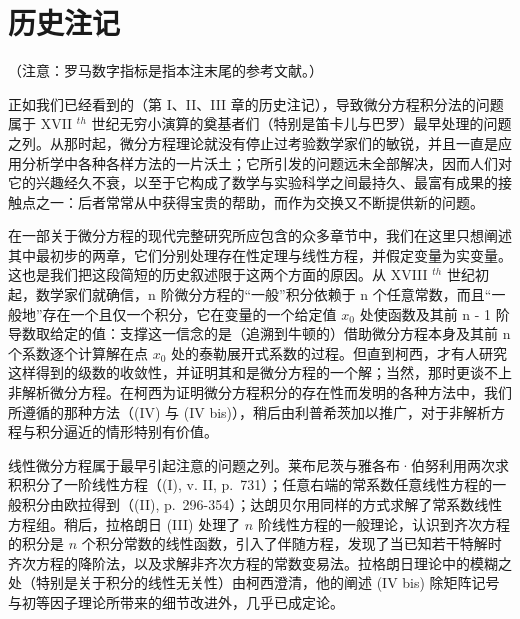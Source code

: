\section*{历史注记}
{}

（注意：罗马数字指标是指本注末尾的参考文献。）

正如我们已经看到的（第 I、II、III 章的历史注记），导致微分方程积分法的问题属于 XVII \(^{th}\) 世纪无穷小演算的奠基者们（特别是笛卡儿与巴罗）最早处理的问题之列。从那时起，微分方程理论就没有停止过考验数学家们的敏锐，并且一直是应用分析学中各种各样方法的一片沃土；它所引发的问题远未全部解决，因而人们对它的兴趣经久不衰，以至于它构成了数学与实验科学之间最持久、最富有成果的接触点之一：后者常常从中获得宝贵的帮助，而作为交换又不断提供新的问题。

在一部关于微分方程的现代完整研究所应包含的众多章节中，我们在这里只想阐述其中最初步的两章，它们分别处理存在性定理与线性方程，并假定变量为实变量。这也是我们把这段简短的历史叙述限于这两个方面的原因。从 XVIII \(^{th}\) 世纪初起，数学家们就确信，n 阶微分方程的“一般”积分依赖于 n 个任意常数，而且“一般地”存在一个且仅一个积分，它在变量的一个给定值 \(x_{0}\) 处使函数及其前 n - 1 阶导数取给定的值：支撑这一信念的是（追溯到牛顿的）借助微分方程本身及其前 n 个系数逐个计算解在点 \(x_{0}\) 处的泰勒展开式系数的过程。但直到柯西，才有人研究这样得到的级数的收敛性，并证明其和是微分方程的一个解；当然，那时更谈不上非解析微分方程。在柯西为证明微分方程积分的存在性而发明的各种方法中，我们所遵循的那种方法（(IV) 与 (IV bis)），稍后由利普希茨加以推广，对于非解析方程与积分逼近的情形特别有价值。

线性微分方程属于最早引起注意的问题之列。莱布尼茨与雅各布·伯努利用两次求积积分了一阶线性方程（(I), v. II, p.~731）；任意右端的常系数任意线性方程的一般积分由欧拉得到（(II), p.~296-354）；达朗贝尔用同样的方式求解了常系数线性方程组。稍后，拉格朗日 (III) 处理了 \(n\) 阶线性方程的一般理论，认识到齐次方程的积分是 \(n\) 个积分常数的线性函数，引入了伴随方程，发现了当已知若干特解时齐次方程的降阶法，以及求解非齐次方程的常数变易法。拉格朗日理论中的模糊之处（特别是关于积分的线性无关性）由柯西澄清，他的阐述 (IV bis) 除矩阵记号与初等因子理论所带来的细节改进外，几乎已成定论。

